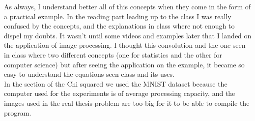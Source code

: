 \documentclass{article}
\begin{document}
As always, I understand better all of this concepts when they come in the form of a practical example. In the reading part leading up to the class I was really confused by the concepts, and the explanations in class where not enough to dispel my doubts. It wasn't until some videos and examples later that I landed on the application of image processing. I thought this convolution and the one seen in class where two different concepts (one for statistics and the other for computer science) but after seeing the application on the example, it became so easy to understand the equations seen class and its uses.\\

In the section of the Chi squared we used the MNIST  dataset because the computer used for the experiments is of average processing capacity, and the images used in the real thesis problem are too big for it to be able to compile the program.\\





 
\end{document}
